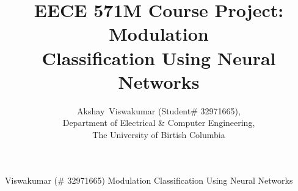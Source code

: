 \documentclass[journal,onecolumn]{IEEEtran}
\begin{document}
%
\title{EECE 571M Course Project: Modulation\\ Classification Using Neural Networks}
%
%
%

\author{Akshay~Viswakumar (Student\# 32971665), \\Department of Electrical \& Computer Engineering, \\The University of Birtish Columbia
}

% 
%

%
{Viswakumar (\# 32971665) \: Modulation Classification Using Neural Networks}
% 
\end{document}
